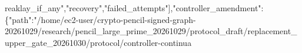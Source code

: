 \documentclass[10pt]{article}
\begin{document}
reak{}l\allowbreak{}a\allowbreak{}y\allowbreak{}\_\allowbreak{}i\allowbreak{}f\allowbreak{}\_\allowbreak{}a\allowbreak{}n\allowbreak{}y\allowbreak{}"\allowbreak{},\allowbreak{}"\allowbreak{}r\allowbreak{}e\allowbreak{}c\allowbreak{}o\allowbreak{}v\allowbreak{}e\allowbreak{}r\allowbreak{}y\allowbreak{}"\allowbreak{},\allowbreak{}"\allowbreak{}f\allowbreak{}a\allowbreak{}i\allowbreak{}l\allowbreak{}e\allowbreak{}d\allowbreak{}\_\allowbreak{}a\allowbreak{}t\allowbreak{}t\allowbreak{}e\allowbreak{}m\allowbreak{}p\allowbreak{}t\allowbreak{}s\allowbreak{}"\allowbreak{}]\allowbreak{},\allowbreak{}"\allowbreak{}c\allowbreak{}o\allowbreak{}n\allowbreak{}t\allowbreak{}r\allowbreak{}o\allowbreak{}l\allowbreak{}l\allowbreak{}e\allowbreak{}r\allowbreak{}\_\allowbreak{}a\allowbreak{}m\allowbreak{}e\allowbreak{}n\allowbreak{}d\allowbreak{}m\allowbreak{}e\allowbreak{}n\allowbreak{}t\allowbreak{}"\allowbreak{}:\allowbreak{}\{\allowbreak{}"\allowbreak{}p\allowbreak{}a\allowbreak{}t\allowbreak{}h\allowbreak{}"\allowbreak{}:\allowbreak{}"\allowbreak{}/\allowbreak{}h\allowbreak{}o\allowbreak{}m\allowbreak{}e\allowbreak{}/\allowbreak{}e\allowbreak{}c\allowbreak{}2\allowbreak{}-\allowbreak{}u\allowbreak{}s\allowbreak{}e\allowbreak{}r\allowbreak{}/\allowbreak{}c\allowbreak{}r\allowbreak{}y\allowbreak{}p\allowbreak{}t\allowbreak{}o\allowbreak{}-\allowbreak{}p\allowbreak{}e\allowbreak{}n\allowbreak{}c\allowbreak{}i\allowbreak{}l\allowbreak{}-\allowbreak{}s\allowbreak{}i\allowbreak{}g\allowbreak{}n\allowbreak{}e\allowbreak{}d\allowbreak{}-\allowbreak{}g\allowbreak{}r\allowbreak{}a\allowbreak{}p\allowbreak{}h\allowbreak{}-\allowbreak{}2\allowbreak{}0\allowbreak{}2\allowbreak{}6\allowbreak{}1\allowbreak{}0\allowbreak{}2\allowbreak{}9\allowbreak{}/\allowbreak{}r\allowbreak{}e\allowbreak{}s\allowbreak{}e\allowbreak{}a\allowbreak{}r\allowbreak{}c\allowbreak{}h\allowbreak{}/\allowbreak{}p\allowbreak{}e\allowbreak{}n\allowbreak{}c\allowbreak{}i\allowbreak{}l\allowbreak{}\_\allowbreak{}l\allowbreak{}a\allowbreak{}r\allowbreak{}g\allowbreak{}e\allowbreak{}\_\allowbreak{}p\allowbreak{}r\allowbreak{}i\allowbreak{}m\allowbreak{}e\allowbreak{}\_\allowbreak{}2\allowbreak{}0\allowbreak{}2\allowbreak{}6\allowbreak{}1\allowbreak{}0\allowbreak{}2\allowbreak{}9\allowbreak{}/\allowbreak{}p\allowbreak{}r\allowbreak{}o\allowbreak{}t\allowbreak{}o\allowbreak{}c\allowbreak{}o\allowbreak{}l\allowbreak{}\_\allowbreak{}d\allowbreak{}r\allowbreak{}a\allowbreak{}f\allowbreak{}t\allowbreak{}/\allowbreak{}r\allowbreak{}e\allowbreak{}p\allowbreak{}l\allowbreak{}a\allowbreak{}c\allowbreak{}e\allowbreak{}m\allowbreak{}e\allowbreak{}n\allowbreak{}t\allowbreak{}\_\allowbreak{}u\allowbreak{}p\allowbreak{}p\allowbreak{}e\allowbreak{}r\allowbreak{}\_\allowbreak{}g\allowbreak{}a\allowbreak{}t\allowbreak{}e\allowbreak{}\_\allowbreak{}2\allowbreak{}0\allowbreak{}2\allowbreak{}6\allowbreak{}1\allowbreak{}0\allowbreak{}3\allowbreak{}0\allowbreak{}/\allowbreak{}p\allowbreak{}r\allowbreak{}o\allowbreak{}t\allowbreak{}o\allowbreak{}c\allowbreak{}o\allowbreak{}l\allowbreak{}/\allowbreak{}c\allowbreak{}o\allowbreak{}n\allowbreak{}t\allowbreak{}r\allowbreak{}o\allowbreak{}l\allowbreak{}l\allowbreak{}e\allowbreak{}r\allowbreak{}-\allowbreak{}c\allowbreak{}o\allowbreak{}n\allowbreak{}t\allowbreak{}i\allowbreak{}n\allowbreak{}u\allowbreak{}a\allowbreak{}
\end{document}

